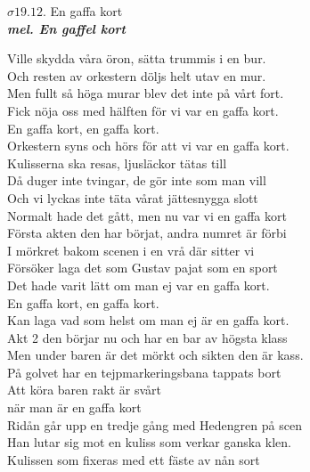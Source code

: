 \documentclass[a6paper,10pt]{article}
\newcommand{\mel}[1]{\small\textbf{\textit{mel. #1 \\}}}
\begin{document}
\begin{center}
\Large $\sigma19.12$. En gaffa kort \\
\mel{En gaffel kort}
\end{center} \small 
Ville skydda våra öron, sätta trummis i en bur. \\
Och resten av orkestern döljs helt utav en mur. \\
Men fullt så höga murar blev det inte på vårt fort. \\
Fick nöja oss med hälften för vi var en gaffa kort.
\vspace{5pt}\\
En gaffa kort, en gaffa kort.\\
Orkestern syns och hörs för att vi var en gaffa kort.
\vspace{5pt}\\
Kulisserna ska resas, ljusläckor tätas till\\
Då duger inte tvingar, de gör inte som man vill\\
Och vi lyckas inte täta vårat jättesnygga slott\\
Normalt hade det gått, men nu var vi en gaffa kort
\vspace{5pt}\\
Första akten den har börjat, andra numret är förbi\\
I mörkret bakom scenen i en vrå där sitter vi\\
Försöker laga det som Gustav pajat som en sport\\
Det hade varit lätt om man ej var en gaffa kort.
\vspace{5pt}\\
En gaffa kort, en gaffa kort.\\
Kan laga vad som helst om man ej är en gaffa kort.
\vspace{5pt}\\
Akt 2 den börjar nu och har en bar av högsta klass\\
Men under baren är det mörkt och sikten den är kass.\\
På golvet har en tejpmarkeringsbana tappats bort\\
Att köra baren rakt är svårt\\
när man är en gaffa kort
\vspace{5pt}\\
Ridån går upp en tredje gång med Hedengren på scen\\
Han lutar sig mot en kuliss som verkar ganska klen.\\
Kulissen som fixeras med ett fäste av nån sort\\
\end{document}
